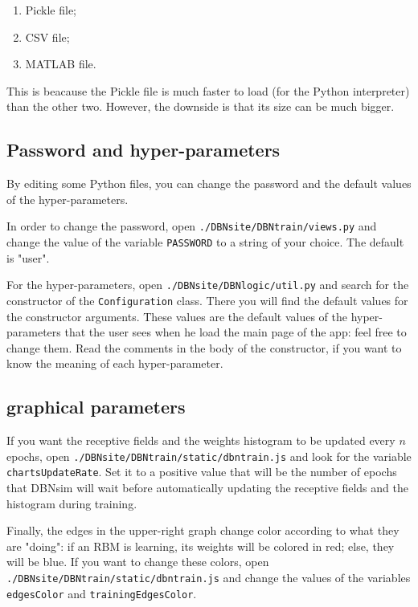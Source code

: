 \documentclass[a4paper]{article}
\begin{document}
	\begin{enumerate}
		
			
	\item Pickle file;
			
	\item CSV file;
			
	\item MATLAB file.
		
	\end{enumerate}

		
This is beacause the Pickle file is much faster to load (for the Python interpreter) than the other two. However, the downside is that its size can be much bigger.

		
	\subsection{Password and hyper-parameters}

		
By editing some Python files, you can change the password and the default values of the hyper-parameters.
		
In order to change the password, open \texttt{./DBNsite/DBNtrain/views.py} and change the value of the variable \texttt{PASSWORD} to a string of your choice. The default is "user".
		
For the hyper-parameters, open \texttt{./DBNsite/DBNlogic/util.py} and search for the constructor of the \texttt{Configuration} class. There you will find the default values for the constructor arguments. These values are the default values of the hyper-parameters that the user sees when he load the main page of the app: feel free to change them. Read the comments in the body of the constructor, if you want to know the meaning of each hyper-parameter.

		
	\subsection{graphical parameters}

		
If you want the receptive fields and the weights histogram to be updated every $n$ epochs, open \texttt{./DBNsite/DBNtrain/static/dbntrain.js} and look for the variable \texttt{chartsUpdateRate}. Set it to a positive value that will be the number of epochs that DBNsim will wait before automatically updating the receptive fields and the histogram during training.
		
Finally, the edges in the upper-right graph change color according to what they are "doing": if an RBM is learning, its weights will be colored in red; else, they will be blue. If you want to change these colors, open \texttt{./DBNsite/DBNtrain/static/dbntrain.js} and change the values of the variables \texttt{edgesColor} and \texttt{trainingEdgesColor}.
	
\end{document}
